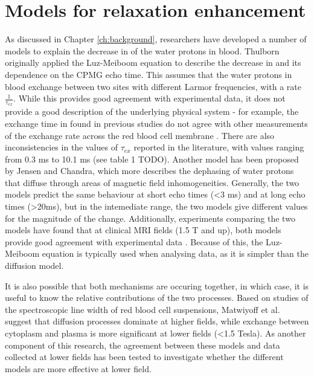 \chapter{Models for \Ttwo relaxation enhancement}\label{ch:models}

As discussed in Chapter \ref{ch:background}, researchers have developed a number of models to explain the decrease in \Ttwo of the water protons in blood.
Thulborn originally applied the Luz-Meiboom equation to describe the decrease in \Ttwo and its dependence on the CPMG echo time\cite{ThulbornOxygenationdependencetransverse1982}.
This assumes that the water protons in blood exchange between two sites with different Larmor frequencies, with a rate $\frac{1}{\tau_{ex}}$.
While this provides good agreement with experimental data, it does not provide a good description of the underlying physical system - for example, the exchange time in found in previous studies do not agree with other measurements of the exchange rate across the red blood cell membrane \cite{MeyerNMRrelaxationrates1995}.
There are also inconsistencies in the values of $\tau_{ex}$ reported in the literature, with values ranging from 0.3 ms to 10.1 ms (see table 1 TODO).
Another model has been proposed by Jensen and Chandra, which more describes the dephasing of water protons that diffuse through areas of magnetic field inhomogeneities\cite{JensenNMRrelaxationtissues2000}.
Generally, the two models predict the same behaviour at short echo times (\textless 3 ms) and at long echo times (\textgreater 20ms)\cite{BrooksT2shorteningweaklymagnetized2001}, but in the intemediate range, the two models give different values for the magnitude of the \Ttwo change.
Additionally, experiments comparing the two models have found that at clinical MRI fields (1.5 T and up), both models provide good agreement with experimental data \cite{StefanovicHumanwholebloodrelaxometry2004,ChenHumanwholeblood2009,GardenerDependencebloodR22010,GrgacHematocritoxygenationdependence2013}.
Because of this, the Luz-Meiboom equation is typically used when analysing data, as it is simpler than the diffusion model.

It is also possible that both mechanisms are occuring together, in which case, it is useful to know the relative contributions of the two processes.
Based on studies of the spectroscopic line width of red blood cell suspensions, Matwiyoff et al. suggest that diffusion processes dominate at higher fields, while exchange between cytoplasm and plasma is more significant at lower fields (\textless 1.5 Tesla)\cite{Matwiyofflineshapeswater1990}.
As another component of this research, the agreement between these models and data collected at lower fields has been tested to investigate whether the different models are more effective at lower field.

